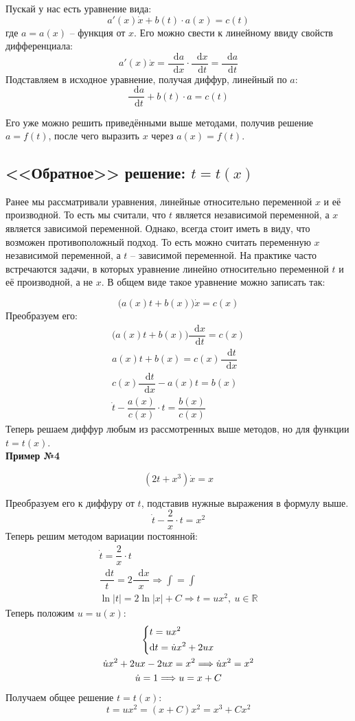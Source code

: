 \documentclass[a4paper,12pt]{article}
\newcommand{\R}{\mathbb{R}}
\renewcommand*\d{\mathop{}\!\mathrm{d}}
\newcommand{\dt}{\dot{t}}
\newcommand{\du}{\dot{u}}
\newcommand{\dx}{\dot{x}}
\newcommand{\ds}{\displaystyle}
\begin{document}
Пускай у нас есть уравнение вида: \[a'(x)\dx + b(t)\cdot a(x) = c(t)\] где $a = a(x)$ -- функция от \underline{$x$}. Его можно свести к линейному ввиду свойств дифференциала:
\[a'(x)\dx = \dfrac{\d a}{\d x} \cdot \dfrac{\d x}{\d t} = \dfrac{\d a}{\d t}\]
Подставляем в исходное уравнение, получая диффур, линейный по \underline{$a$}:
\[\dfrac{\d a}{\d t} + b(t) \cdot a = c(t)\]

Его уже можно решить приведёнными выше методами, получив решение $a = f(t)$, после чего выразить $x$ через $a(x) = f(t)$.

\subsection{<<Обратное>> решение: $t = t(x)$}

Ранее мы рассматривали уравнения, линейные относительно переменной $x$ и её производной. То есть мы считали, что $t$ является независимой переменной, а $x$ является зависимой переменной. Однако, всегда стоит иметь в виду, что возможен противоположный подход. То есть можно считать переменную $x$ независимой переменной, а $t$ – зависимой переменной. На практике часто встречаются задачи, в которых уравнение линейно относительно переменной $t$ и её производной, а не $x$. В общем виде такое уравнение можно записать так:

\[\big(a(x)t + b(x)\big)\dx = c(x)\]
Преобразуем его:
\begin{gather*}
	\big(a(x)t + b(x)\big)\dfrac{\d x}{\d t} = c(x)\\
	a(x)t + b(x) = c(x)\dfrac{\d t}{\d x}\\
	c(x)\dfrac{\d t}{\d x} - a(x)t = b(x)\\
	\dt - \dfrac{a(x)}{c(x)}\cdot t = \dfrac{b(x)}{c(x)}
\end{gather*}
Теперь решаем диффур любым из рассмотренных выше методов, но для функции $t = t(x)$.
\ \\

\textbf{Пример №4}

\[(2t + x^3)\dx = x\]

Преобразуем его к диффуру от $t$, подставив нужные выражения в формулу выше.
\[\dt - \dfrac{2}{x} \cdot t = x^2\]
Теперь решим методом вариации постоянной:
\begin{gather*}
\dt = \dfrac{2}{x} \cdot t\\
\dfrac{\d t}{t} = 2\dfrac{\d x}{x} \Longrightarrow \ds\int = \int\\
\ln|t| = 2\ln|x| + C \Longrightarrow t = ux^2,\ u \in \R
\end{gather*}
Теперь положим $u = u(x)$:
\begin{gather*}
\left\{\begin{gathered}
t = ux^2\hfill\\
\d t = \du x^2 + 2ux\hfill
\end{gathered}\right.\\
\du x^2 + 2ux - 2ux = x^2 \Longrightarrow \du x^2 = x^2\\
\du = 1 \Longrightarrow u = x + C
\end{gather*}
Получаем общее решение $t = t(x)$:
\[t = ux^2 = (x + C)x^2 = x^3 + Cx^2\]
\end{document}
